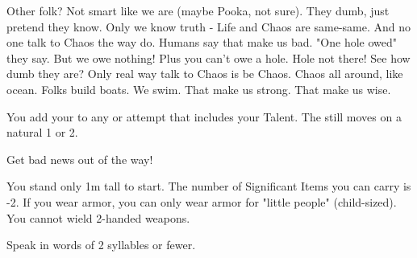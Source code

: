 {  



  Other folk? Not smart like we are (maybe Pooka, not sure).  They dumb, just pretend they know.  Only we know truth - Life and Chaos are same-same.  And no one talk to Chaos the way  do. Humans say that make us bad. "One hole owed" they say.  But we owe nothing! Plus you can't owe a hole. Hole not there! See how dumb they are? Only real way talk to Chaos is be Chaos.  Chaos all around, like ocean. Folks build boats.  We swim.  That make us strong. That make us wise.


  


  You add your \LVL to any \RO or \RB attempt that includes your Talent.  The \UD still moves \DCDOWN on a natural 1 or 2.

  \cbreak


    Get bad news out of the way!

  
  You stand only 1m tall to start.  The number of Significant Items you can carry is -2. If you wear armor, you can only wear armor for "little people" (child-sized).  You cannot wield 2-handed weapons.


  Speak in words of 2 syllables or fewer.


}
